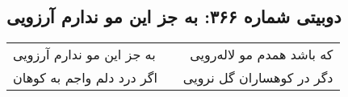 \begin{center}
\section*{دوبیتی شماره ۳۶۶: به جز این مو ندارم آرزویی}
\label{sec:366}
\begin{longtable}{l p{0.5cm} r}
به جز این مو ندارم آرزویی
&&
که باشد همدم مو لاله‌رویی
\\
اگر درد دلم واجم به کوهان
&&
دگر در کوهساران گل نرویی
\\
\end{longtable}
\end{center}
